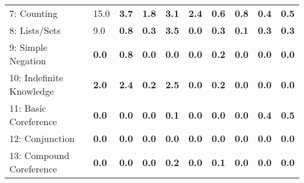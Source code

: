 \documentclass{article} \usepackage{iclr2018_conference,times}
\begin{document}
\begin{table}[t]
\begin{adjustbox}{max width=\textwidth}
\begin{tabular}{l|lllllllll}
7: Counting                          & 15.0                      & \textbf{3.7}                       & \textbf{1.8}                         & \textbf{3.1}                     & \textbf{2.4}                      & \textbf{0.6}                    & \textbf{0.8}                        &\textbf{0.4}                &\textbf{0.5}                    \\
8: Lists/Sets                        & 9.0                       & \textbf{0.8}                        & \textbf{0.3}                         & \textbf{3.5}                     & \textbf{0.0}                     & \textbf{0.3}                     &\textbf{0.1} & \textbf{0.3}                   & \textbf{0.3}                     \\
9: Simple Negation                   & \textbf{0.0}                       & \textbf{0.8}                        & \textbf{0.0}                         & \textbf{0.0 } & \textbf{0.0}                      & \textbf{0.2}                     &\textbf{ 0.0 }                       & \textbf{0.0}                   &\textbf{0.0}                    \\
10: Indefinite Knowledge             & \textbf{2.0}                       & \textbf{2.4}                      & \textbf{0.2} &\textbf{2.5}                     & \textbf{0.0}                      & \textbf{0.2}                     & \textbf{0.0}                        & \textbf{0.0}                    & \textbf{0.0}                   \\
11: Basic Coreference                & \textbf{0.0}                       & \textbf{0.0}                        & \textbf{0.0}                         & \textbf{0.1}                    & \textbf{0.0}                      & \textbf{0.0}                     & \textbf{0.0}                        & \textbf{0.4}                  & \textbf{0.5}                    \\
12: Conjunction                      & \textbf{0.0}                       & \textbf{0.0}                        & \textbf{0.0}                         & \textbf{0.0}                     &\textbf{0.0}                      &\textbf{0.0}                     & \textbf{0.0}                        & \textbf{0.0}                   & \textbf{0.0}                     \\
13: Compound Coreference             & \textbf{0.0}                       & \textbf{0.0}                        & \textbf{0.0} & \textbf{0.2}                     & \textbf{0.0}                      & \textbf{0.1} & \textbf{0.0}                        & \textbf{0.0}                 & \textbf{0.0}                     \\

\end{tabular}
\end{adjustbox}
\end{table}
\end{document}
